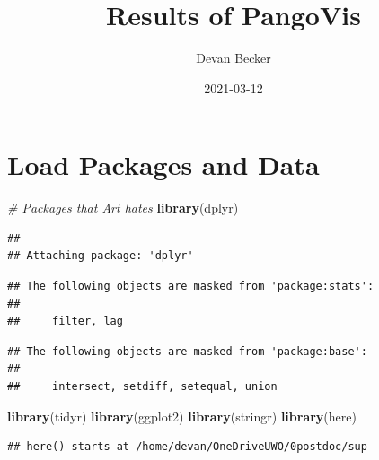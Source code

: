 \documentclass[]{article}
\title{Results of PangoVis}
\author{Devan Becker}
\date{2021-03-12}
\newenvironment{Shaded}{\begin{snugshade}}{\end{snugshade}}
\newcommand{\CommentTok}[1]{\textcolor[rgb]{0.56,0.35,0.01}{\textit{#1}}}
\newcommand{\KeywordTok}[1]{\textcolor[rgb]{0.13,0.29,0.53}{\textbf{#1}}}
\newcommand{\NormalTok}[1]{#1}
\begin{document}
\maketitle

\hypertarget{load-packages-and-data}{%
\section{Load Packages and Data}\label{load-packages-and-data}}

\begin{Shaded}
\begin{Highlighting}[]
\CommentTok{# Packages that Art hates}
\KeywordTok{library}\NormalTok{(dplyr)}
\end{Highlighting}
\end{Shaded}

\begin{verbatim}
## 
## Attaching package: 'dplyr'
\end{verbatim}

\begin{verbatim}
## The following objects are masked from 'package:stats':
## 
##     filter, lag
\end{verbatim}

\begin{verbatim}
## The following objects are masked from 'package:base':
## 
##     intersect, setdiff, setequal, union
\end{verbatim}

\begin{Shaded}
\begin{Highlighting}[]
\KeywordTok{library}\NormalTok{(tidyr)}
\KeywordTok{library}\NormalTok{(ggplot2)}
\KeywordTok{library}\NormalTok{(stringr)}
\KeywordTok{library}\NormalTok{(here)}
\end{Highlighting}
\end{Shaded}

\begin{verbatim}
## here() starts at /home/devan/OneDriveUWO/0postdoc/sup
\end{verbatim}
\end{document}
